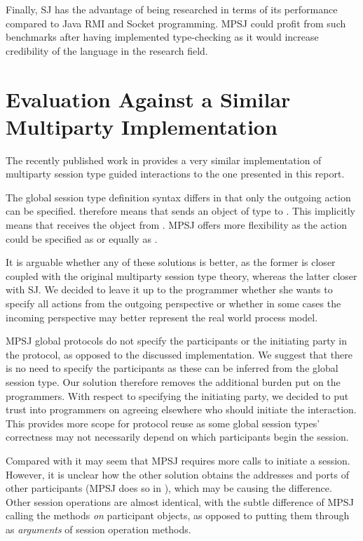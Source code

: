 Finally, SJ has the advantage of being researched in terms of its performance compared to Java RMI and Socket programming. MPSJ could profit from such benchmarks after having implemented type-checking as it would increase credibility of the language in the research field.

\section{Evaluation Against a Similar Multiparty Implementation}

The recently published work in \cite{sess_type_guided_distr_interact} provides a very similar implementation of multiparty session type guided interactions to the one presented in this report. 

The global session type definition syntax differs in that only the outgoing action can be specified.  therefore means that  sends an object of type  to . This implicitly means that  receives the object from . MPSJ offers more flexibility as the action could be specified as  or equally as . 

It is arguable whether any of these solutions is better, as the former is closer coupled with the original multiparty session type theory, whereas the latter closer with SJ. We decided to leave it up to the programmer whether she wants to specify all actions from the outgoing perspective or whether in some cases the incoming perspective may better represent the real world process model.

MPSJ global protocols do not specify the participants or the initiating party in the protocol, as opposed to the discussed implementation. We suggest that there is no need to specify the participants as these can be inferred from the global session type. Our solution therefore removes the additional burden put on the programmers. With respect to specifying the initiating party, we decided to put trust into programmers on agreeing elsewhere who should initiate the interaction. This provides more scope for protocol reuse as some global session types' correctness may not necessarily depend on which participants begin the session.

Compared with \cite{sess_type_guided_distr_interact} it may seem that MPSJ requires more calls to initiate a session. However, it is unclear how the other solution obtains the addresses and ports of other participants (MPSJ does so in ), which may be causing the difference. Other session operations are almost identical, with the subtle difference of MPSJ calling the methods \textit{on} participant objects, as opposed to putting them through as \textit{arguments} of session operation methods.

